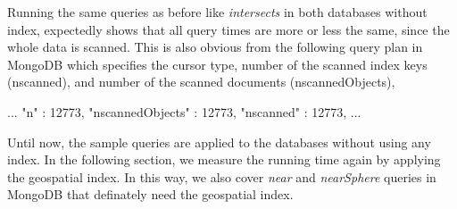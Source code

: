 \documentclass[a4paper,12pt]{article}
\begin{document}

Running the same queries as before like \textit{intersects} in both databases without index, expectedly shows that all query times are more or less the same, since the whole data is scanned. This is also obvious from the following query plan in MongoDB which specifies the cursor type, number of the scanned index keys (nscanned), and number of the scanned documents (nscannedObjects),
\vspace{10px}
\begin{fakeJSON}
...
"n" : 12773,
"nscannedObjects" : 12773,
"nscanned" : 12773,
...
\end{fakeJSON}
\vspace{10px}



Until now, the sample queries are applied to the databases without using any index. 
In the following section, we measure the running time again by applying the geospatial index.
In this way, we also cover \textit{near} and \textit{nearSphere} queries in MongoDB that definately need the geospatial index.  


\end{document}
